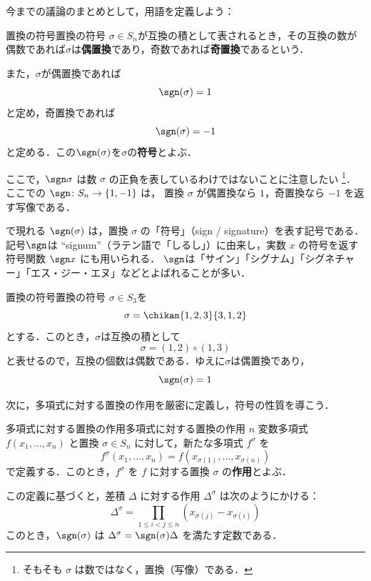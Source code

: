 今までの議論のまとめとして，用語を定義しよう：

\begin{definition}{置換の符号}{置換の符号}
  $\sigma \in S_n$が互換の積として表されるとき，その互換の数が偶数であれば$\sigma$は\textbf{偶置換}であり，奇数であれば\textbf{奇置換}であるという．
  
  また，$\sigma$が偶置換であれば
  \[
  \sgn(\sigma) = 1
  \]
  と定め，奇置換であれば
  \[
  \sgn(\sigma) = -1
  \]
  と定める．この$\sgn(\sigma)$を$\sigma$の\textbf{符号}とよぶ．
\end{definition}


ここで，$\sgn \sigma$ は数 $\sigma$ の正負を表しているわけではないことに注意したい
\footnote{そもそも $\sigma$ は数ではなく，置換（写像）である．}．
ここでの $\sgn \colon S_n \to \{1,-1\}$ は，
置換 $\sigma$ が偶置換なら $1$，奇置換なら $-1$ を返す写像である．



\begin{mycolumn}
  で現れる $\sgn(\sigma)$ は，置換 $\sigma$ の「符号」（sign / signature）を表す記号である．
  記号$\sgn$は ``signum''（ラテン語で「しるし」）に由来し，実数 $x$ の符号を返す符号関数 $\sgn x$ にも用いられる．
  $\sgn$は「サイン」「シグナム」「シグネチャー」「エス・ジー・エヌ」などとよばれることが多い．
\end{mycolumn}

\begin{example}{置換の符号}{置換の符号}
  $\sigma \in S_3$を
  \[
  \sigma = \chikan{1, 2, 3}{3, 1, 2}
  \]
  とする．このとき，$\sigma$は互換の積として
  \[
  \sigma = (1, 2) \circ (1, 3)
  \]
  と表せるので，互換の個数は偶数である．ゆえに$\sigma$は偶置換であり，
  \[
  \sgn(\sigma) = 1
  \]
\end{example}


次に，多項式に対する置換の作用を厳密に定義し，符号の性質を導こう．
\begin{definition}{多項式に対する置換の作用}{多項式に対する置換の作用}
  $n$ 変数多項式 $f(x_1, \dots, x_n)$ と置換 $\sigma \in S_n$ に対して，新たな多項式 $f^\sigma$ を
  \[
  f^\sigma(x_1, \dots, x_n) = f(x_{\sigma(1)}, \dots, x_{\sigma(n)})
  \]
  で定義する．このとき，$f^\sigma$ を $f$ に対する置換 $\sigma$ の\textbf{作用}とよぶ．
\end{definition}

この定義に基づくと，差積 $\Delta$ に対する作用 $\Delta^\sigma$ は次のようにかける：
\[
\Delta^\sigma = \prod_{1 \le i < j \le n} (x_{\sigma(j)} - x_{\sigma(i)})
\]
このとき，$\sgn(\sigma)$ は $\Delta^\sigma = \sgn(\sigma) \Delta$ を満たす定数である．

